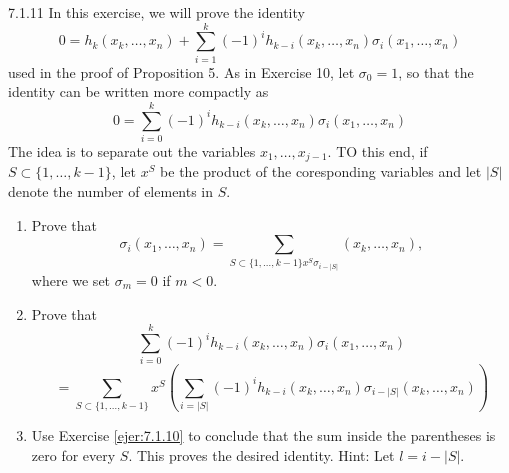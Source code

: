 \documentclass[twoside]{article}
\begin{document}
\begin{ejercicio}{7.1.11}
In this exercise, we will prove the identity
\[ 0 = h_k(x_k, \dots, x_n) + \sum_{i=1}^k (-1)^i h_{k-i}(x_k,\dots,x_n) σ_i(x_1,\dots,x_n) \]
used in the proof of Proposition 5.
As in Exercise 10, let $σ_0 = 1$, so that the identity can be written more compactly as
\[ 0 = \sum_{i=0}^k (-1)^i h_{k-i}(x_k,\dots,x_n) σ_i(x_1,\dots,x_n) \]
The idea is to separate out the variables $x_1,\dots,x_{j-1}$.
TO this end, if $S \subset \{1,\dots,k-1\}$, let $x^S$ be the product of the coresponding variables and let $|S|$ denote the number of elements in $S$.
\begin{enumerate}
\item Prove that
\[ σ_i(x_1,\dots,x_n) = \sum_{S \subset \{1,\dots,k-1\} x^S σ_{i-|S|}}(x_k,\dots,x_n), \]
where we set $σ_m = 0$ if $m < 0$.
\item Prove that
\[ \sum_{i=0}^k (-1)^i h_{k-i}(x_k,\dots,x_n) σ_i(x_1,\dots,x_n) \]
\[ = \sum_{S \subset \{1,\dots,k-1\}} x^S \left(\sum_{i=|S|} (-1)^i h_{k-i}(x_k,\dots,x_n) σ_{i-|S|}(x_k,\dots,x_n)\right) \]
\item Use Exercise \ref{ejer:7.1.10} to conclude that the sum inside the parentheses is zero for every $S$.
This proves the desired identity.
Hint: Let $l = i-|S|$.
\end{enumerate}

\end{ejercicio}

\newpage
\end{document}
